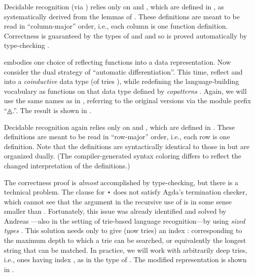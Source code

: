 \documentclass[acmsmall,screen,anonymous,timestamp]{acmart}
\begin{document}
Decidable recognition (via {}) relies only on  and , which are defined in , as systematically derived from the lemmas of .
These definitions are meant to be read in ``column-major'' order, i.e., each column is one function definition.
Correctness is guaranteed by the types of  and  and so is proved automatically by type-checking .

\rnc{}

\rnc{}

 embodies one choice of reflecting functions into a data representation.
Now consider the dual strategy of ``automatic differentiation''.
This time, reflect  and  into a \emph{coinductive} data type (of tries \needcite{}), while redefining the language-building vocabulary as functions on that data type defined by \emph{copatterns} \citep{AbelPientka2016}.
Again, we will use the same names as in , referring to the original versions via the module prefix ``{◬.}\hspace{0.05em}''.
The result is shown in .

Decidable recognition again relies only on  and , which are defined in .
These definitions are meant to be read in ``row-major'' order, i.e., each row is one definition.
Note that the definitions are syntactically identical to those in  but are organized dually.
(The compiler-generated syntax coloring differs to reflect the changed interpretation of the definitions.)

The correctness proof is \emph{almost} accomplished by type-checking, but there is a technical problem.
The  clause for { \AF ⋆ } does not satisfy Agda's termination checker, which cannot see that the argument {  } in the recursive use of  is in some sense smaller than .
Fortunately, this issue was already identified and solved by Andreas \citet{Abel2016}---also in the setting of trie-based language recognition---by using \emph{sized types} \citep{Abel2008, AbelPientka2016}.
\rnc{}
This solution needs only to give  (now tries) an index { \AK : } corresponding to the maximum depth to which a trie can be searched, or equivalently the longest string that can be matched.
In practice, we will work with arbitrarily deep tries, i.e., ones having index , as in the type of {}.
The modified representation is shown in .
\end{document}
